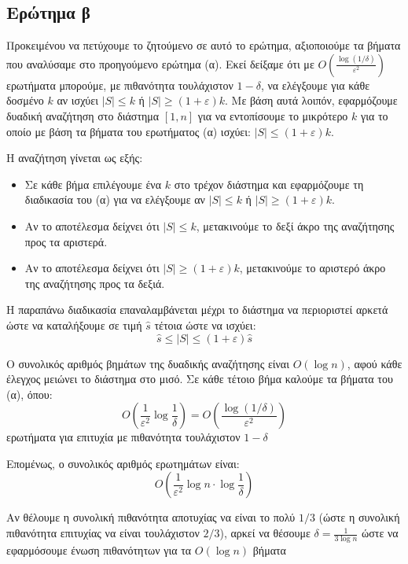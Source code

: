 \documentclass[12pt]{article}
\begin{document}
\subsection*{Ερώτημα β}
Προκειμένου να πετύχουμε το ζητούμενο σε αυτό το ερώτημα, αξιοποιούμε τα βήματα που αναλύσαμε στο προηγούμενο ερώτημα (α). Εκεί δείξαμε ότι με $O\left( \frac{\log(1/\delta)}{\varepsilon^2} \right)$ ερωτήματα μπορούμε, με πιθανότητα τουλάχιστον $1 - \delta$, να ελέγξουμε για κάθε δοσμένο $k$ αν ισχύει $|S| \leq k$ ή $|S| \geq (1 + \varepsilon)k$.
Με βάση αυτά λοιπόν, εφαρμόζουμε δυαδική αναζήτηση στο διάστημα $[1, n]$ για να εντοπίσουμε το μικρότερο $k$ για το οποίο με βάση τα βήματα του ερωτήματος (α) ισχύει: $|S| \leq (1 + \varepsilon)k$.

\vspace{0.5em}Η αναζήτηση γίνεται ως εξής:

\begin{itemize}
  \item Σε κάθε βήμα επιλέγουμε ένα $k$ στο τρέχον διάστημα και εφαρμόζουμε τη διαδικασία του (α) για να ελέγξουμε αν $|S| \leq k$ ή $|S| \geq (1 + \varepsilon)k$.
  \item Αν το αποτέλεσμα δείχνει ότι $|S| \leq k$, μετακινούμε το δεξί άκρο της αναζήτησης προς τα αριστερά.
  \item Αν το αποτέλεσμα δείχνει ότι $|S| \geq (1 + \varepsilon)k$, μετακινούμε το αριστερό άκρο της αναζήτησης προς τα δεξιά.
\end{itemize}

Η παραπάνω διαδικασία επαναλαμβάνεται μέχρι το διάστημα να περιοριστεί αρκετά ώστε να καταλήξουμε σε τιμή $\hat{s}$ τέτοια ώστε να ισχύει:
\[
\hat{s} \leq |S| \leq (1 + \varepsilon)\hat{s}
\]

Ο συνολικός αριθμός βημάτων της δυαδικής αναζήτησης είναι $O(\log n)$, αφού κάθε έλεγχος μειώνει το διάστημα στο μισό. Σε κάθε τέτοιο βήμα καλούμε τα βήματα του (α), όπου:
\[
O\left( \frac{1}{\varepsilon^2} \log \frac{1}{\delta} \right) = O\left( \frac{\log(1/\delta)}{\varepsilon^2} \right)
\]
ερωτήματα για επιτυχία με πιθανότητα τουλάχιστον $1 - \delta$

\vspace{0.5em}
Επομένως, ο συνολικός αριθμός ερωτημάτων είναι:
\[
O\left( \frac{1}{\varepsilon^2} \log n \cdot \log \frac{1}{\delta} \right)
\]

Αν θέλουμε η συνολική πιθανότητα αποτυχίας να είναι το πολύ $1/3$ (ώστε η συνολική πιθανότητα επιτυχίας να είναι τουλάχιστον $2/3$), αρκεί να θέσουμε $\delta = \frac{1}{3 \log n}$ ώστε να εφαρμόσουμε ένωση πιθανότητων για τα $O(\log n)$ βήματα
\end{document}
